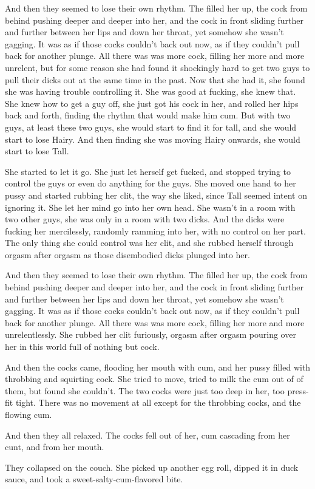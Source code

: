 \documentclass[letterpaper]{article}
\begin{document}
\begin{multicols}{2}
And then they seemed to lose their own rhythm.
The filled her up, the cock from behind pushing deeper and deeper into her, and the cock in front sliding further and further between her lips and down her throat, yet somehow she wasn't gagging.
It was as if those cocks couldn't back out now, as if they couldn't pull back for another plunge.
All there was was more cock, filling her more and more unrelent, but for some reason she had found it shockingly hard to get two guys to pull their dicks out at the same time in the past.
Now that she had it, she found she was having trouble controlling it.
She was good at fucking, she knew that.
She knew how to get a guy off, she just got his cock in her, and rolled her hips back and forth, finding the rhythm that would make him cum.
But with two guys, at least these two guys, she would start to find it for tall, and she would start to lose Hairy.
And then finding she was moving Hairy onwards, she would start to lose Tall.

She started to let it go. She just let herself get fucked, and stopped trying to control the guys or even do anything for the guys.
She moved one hand to her pussy and started rubbing her clit, the way she liked, since Tall seemed intent on ignoring it.
She let her mind go into her own head.
She wasn't in a room with two other guys, she was only in a room with two dicks.
And the dicks were fucking her mercilessly, randomly ramming into her, with no control on her part.
The only thing she could control was her clit, and she rubbed herself through orgasm after orgasm as those disembodied dicks plunged into her.

And then they seemed to lose their own rhythm.
The filled her up, the cock from behind pushing deeper and deeper into her, and the cock in front sliding further and further between her lips and down her throat, yet somehow she wasn't gagging.
It was as if those cocks couldn't back out now, as if they couldn't pull back for another plunge.
All there was was more cock, filling her more and more unrelentlessly.
She rubbed her clit furiously, orgasm after orgasm pouring over her in this world full of nothing but cock.

And then the cocks came, flooding her mouth with cum, and her pussy filled with throbbing and squirting cock.
She tried to move, tried to milk the cum out of of them, but found she couldn't.
The two cocks were just too deep in her, too press-fit tight. There was no movement at all except for the throbbing cocks, and the flowing cum.

And then they all relaxed. The cocks fell out of her, cum cascading from her cunt, and from her mouth.

They collapsed on the couch.
She picked up another egg roll, dipped it in duck sauce, and took a sweet-salty-cum-flavored bite.





\end{multicols}
\end{document}
